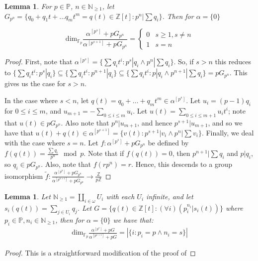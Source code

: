 \documentclass[a4paper,11pt]{article}
\newtheorem{lemma}[theorem]{Lemma}
\newcommand{\nl}{\newline}
\newcommand{\tx}{\textrm}
\renewcommand{\dim}{\tx{dim}}
\begin{document}
\begin{lemma}\label{Base example for dimensions}
	For $p\in\mathbb{P}$, $n\in \mathbb{N}_{\geq 1}$, let $G_{p^n} = \{q_0+q_1t + \dots q_mt^m=q(t)\in \mathbb{Z}[t] : p^n |\sum q_i\}$. Then for $\alpha = \{0\}$
	
	\[ \dim _{\mathbb{F}_p}\frac{\alpha^{[p^s]}+pG_{p^n}}{\alpha^{[p^{s+1}]}+pG_{p^n}} = \begin{cases} 
		0 & s\geq 1, s\neq n \\
		1 & s = n 
	\end{cases}
	\]
\end{lemma}
\begin{proof}
    First, note that $\alpha^{[p^s]} = \{\sum q_i t^i : p^s | q_i \wedge p^n|\sum q_i\}$. So, if $s > n$ this reduces to $\{\sum q_i t^i : p^s | q_i\}\subseteq \{\sum q_it^i : p^{n+1}|q_i\}\subseteq \{\sum q_it^i : p | q_i \wedge p^{n+1} |\sum q_i\} =pG_{p^n}$. This gives us the case for $s > n$.
    
    In the case where $s < n$, let $q(t)=q_0+\dots+q_mt^m\in \alpha^{[p^s]}$.
    Let $u_i = (p-1)q_i$ for $0\leq i \leq m$, and $u_{m+1} = -\sum\limits_{0\leq i \leq m} u_i$. Let $u(t) = \sum\limits_{0\leq i\leq
    m+1}u_it^i$; note that $u(t)\in pG_{p^n} $. Also note that $p^n | u_{m+1}$, and hence $p^{s+1}|u_{m+1}$, and so we have that $u(t) + q(t) \in \alpha^{[p^{s+1}]}=\{v(t) : p^{s+1}|v_i \wedge p^n|\sum v_i\}$.
    \nl\nl
    Finally, we deal with the case where $s=n$. Let $f:
    \alpha^{[p^s]}+pG_{p^n}$ be defined by $f(q(t)) = \frac{\sum q_i}{p^n}
    \mod p$. Note that if $f(q(t)) = 0$, then $p^{n+1}|\sum q_i$ and $p| q_i$,
    so $q_i \in pG_{p^n}$. Also, note that $f(rp^n)=r$. Hence, this descends
    to a group isomorphism $\tilde{f}:\frac{\alpha^{[p^n]}+pG_{p^n}}
    {\alpha^{[p^{n+1}]}+pG_{p^n}}\rightarrow \frac{\mathbb{Z}}{p\mathbb{Z}}$
\end{proof}
\begin{lemma}\label{General example for dimensions}
	Let $\mathbb{N}_{\geq 1} = \coprod\limits_{i\in\omega} U_i$ with each
    $U_i$ infinite, and let $s_i(q(t)) = \sum\limits_{j\in U_i} q_j$. Let $G = 
    \{q(t)\in \mathbb{Z}[t] : (\forall i)( p_i^{n_i} | s_i(t))\}$ where
    $p_i\in\mathbb{P}, n_i\in \mathbb{N}_{\geq 1}$, then for $\alpha = \{0\}$ 
    we have that:
	\begin{align*}
	    \dim _{\mathbb{F}_p}\frac{\alpha^{[p^s]}+pG}{\alpha^{[p^{s+1}]}+pG} = |\{i : p_i = p\wedge n_i = s\}|
	\end{align*}
\end{lemma}
\begin{proof}
    This is a straightforward modification of the proof of 
\end{proof}
\end{document}
